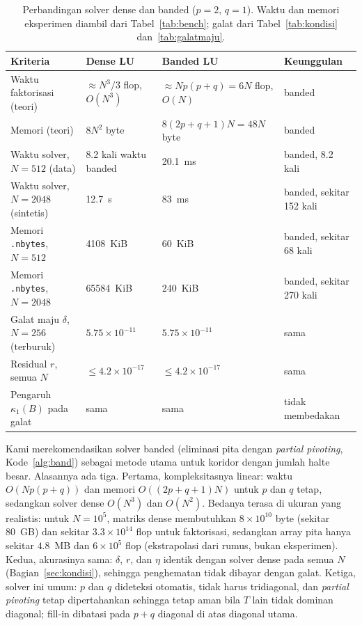 \documentclass[12pt,a4paper]{article}
\numberwithin{equation}{section}
\begin{document}
\begin{table}[H]
\centering
\caption{Perbandingan solver dense dan banded ($p=2$, $q=1$). Waktu dan memori eksperimen diambil dari
Tabel~\ref{tab:bench}; galat dari Tabel~\ref{tab:kondisi} dan~\ref{tab:galatmaju}.}
\label{tab:rekomendasi}
\small
\begin{tabular}{@{}>{\raggedright}p{}>{\raggedright}p{}>{\raggedright}p{}>{\raggedright\arraybackslash}p{}@{}}
\toprule
Kriteria & Dense LU & Banded LU & Keunggulan\\
\midrule
Waktu faktorisasi (teori) & $\approx N^3/3$ flop, $O(N^3)$ & $\approx Np(p+q)=6N$ flop, $O(N)$ & banded\\
Memori (teori) & $8N^2$ byte & $8(2p+q+1)N=48N$ byte & banded\\
Waktu solver, $N=512$ (data) & 8.2 kali waktu banded & 20.1~ms & banded, 8.2 kali\\
Waktu solver, $N=2048$ (sintetis) & 12.7~s & 83~ms & banded, sekitar 152 kali\\
Memori \texttt{.nbytes}, $N=512$ & 4108~KiB & 60~KiB & banded, sekitar 68 kali\\
Memori \texttt{.nbytes}, $N=2048$ & 65584~KiB & 240~KiB & banded, sekitar 270 kali\\
Galat maju $\delta$, $N=256$ (terburuk) & $5.75\times10^{-11}$ & $5.75\times10^{-11}$ & sama\\
Residual $r$, semua $N$ & $\le4.2\times10^{-17}$ & $\le4.2\times10^{-17}$ & sama\\
Pengaruh $\kappa_1(B)$ pada galat & sama & sama & tidak membedakan\\
\bottomrule
\end{tabular}
\end{table}

Kami merekomendasikan solver banded (eliminasi pita dengan \emph{partial pivoting}, Kode~\ref{alg:band}) sebagai metode
utama untuk koridor dengan jumlah halte besar. Alasannya ada tiga. Pertama, kompleksitasnya linear: waktu $O(Np(p+q))$
dan memori $O((2p+q+1)N)$ untuk $p$ dan $q$ tetap, sedangkan solver dense $O(N^3)$ dan $O(N^2)$. Bedanya terasa di
ukuran yang realistis: untuk $N=10^5$, matriks dense membutuhkan $8\times10^{10}$ byte (sekitar 80~GB) dan sekitar
$3.3\times10^{14}$ flop untuk faktorisasi, sedangkan array pita hanya sekitar $4.8$~MB dan $6\times10^{5}$ flop
(ekstrapolasi dari rumus, bukan eksperimen). Kedua, akurasinya sama: $\delta$, $r$, dan $\eta$ identik dengan solver dense
pada semua $N$ (Bagian~\ref{sec:kondisi}), sehingga penghematan tidak dibayar dengan galat. Ketiga, solver ini umum:
$p$ dan $q$ dideteksi otomatis, tidak harus tridiagonal, dan \emph{partial pivoting} tetap dipertahankan sehingga
tetap aman bila $T$ lain tidak dominan diagonal; fill-in dibatasi pada $p+q$ diagonal di atas diagonal utama.
\end{document}
